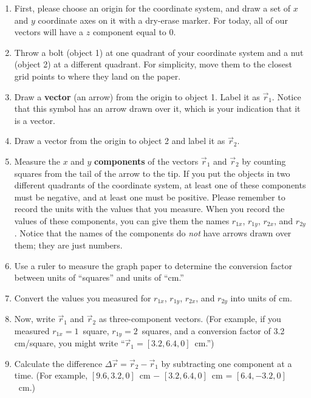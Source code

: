 \documentclass[11pt]{article}
\begin{document}
\begin{enumerate}
\item First, please choose an origin for the coordinate system, and draw a set 
of $x$ and $y$ coordinate axes on it with a dry-erase marker.  For today, all 
of our vectors will have a $z$ component equal to 0.

\item Throw a bolt (object 1) at one quadrant of your coordinate system and a 
nut (object 2) at a different quadrant. For simplicity, move 
them to the closest grid points to where they land on the paper.

\item Draw a {\textbf {vector}} (an arrow) from the origin to object 1.  
  Label it as $\vec{r}_1$.  Notice that this symbol has an arrow drawn 
  over it, which is your indication that it is a vector.

\item Draw a vector from the origin to object 2 and label it as $\vec{r}_2$.

\item Measure the $x$ and $y$ {\textbf{components}} of  
  the vectors $\vec{r}_1$ and  $\vec{r}_2$ by counting squares from the tail 
  of the arrow to the tip.  If you put the objects in two different quadrants 
  of the coordinate system, at least one of these components must be negative, 
  and at least one must be positive.  Please remember to record the units
  with the values that you measure.
  When you record the values of these components, you can give them the 
  names $r_{1x}$, $r_{1y}$, $r_{2x}$, and $r_{2y}$.  Notice that the names
  of the components do {\em not} have arrows drawn over them; they are
  just numbers.

\item Use a ruler to measure the graph paper to determine the conversion factor
   between units of ``squares'' and units of ``cm.''

\item Convert the values you measured for  $r_{1x}$, $r_{1y}$, $r_{2x}$, 
  and $r_{2y}$ into units of cm.

\item Now, write  $\vec{r}_1$ and $\vec{r}_2$ as three-component vectors.  
   (For example, if 
   you measured $r_{1x} = 1$~square, $r_{1y} = 2$~squares, and a conversion
   factor of 3.2 cm/square, you 
   might write ``$\vec{r}_1 = [ 3.2, 6.4, 0 ]$~cm.'')

\item Calculate the difference  $\Delta\vec{r} = \vec{r}_2 - \vec{r}_1$
  by subtracting one component at a time.   (For example, 
  $[ 9.6, 3.2, 0 ]$~cm $-$ $[ 3.2, 6.4, 0 ]$~cm = $[ 6.4, -3.2, 0 ]$~cm.)


\end{enumerate}
\end{document}
